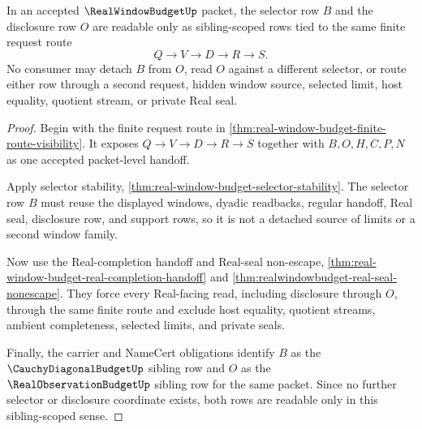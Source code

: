 \begin{theorem}
\label{thm:realwindowbudget-selector-disclosure-scope}
In an accepted $\RealWindowBudgetUp$ packet, the selector row $B$ and the
disclosure row $O$ are readable only as sibling-scoped rows tied to the same
finite request route
$$
Q \to V \to D \to R \to S.
$$
No consumer may detach $B$ from $O$, read $O$ against a different selector, or
route either row through a second request, hidden window source, selected
limit, host equality, quotient stream, or private Real seal.
\end{theorem}
\begin{proof}
Begin with the finite request route in
\autoref{thm:real-window-budget-finite-route-visibility}. It exposes
$Q \to V \to D \to R \to S$ together with $B,O,H,C,P,N$ as one accepted
packet-level handoff.

Apply selector stability, \autoref{thm:real-window-budget-selector-stability}.
The selector row $B$ must reuse the displayed windows, dyadic readbacks,
regular handoff, Real seal, disclosure row, and support rows, so it is not a
detached source of limits or a second window family.

Now use the Real-completion handoff and Real-seal non-escape,
\autoref{thm:real-window-budget-real-completion-handoff} and
\autoref{thm:realwindowbudget-real-seal-nonescape}. They force every
Real-facing read, including disclosure through $O$, through the same finite
route and exclude host equality, quotient streams, ambient completeness,
selected limits, and private seals.

Finally, the carrier and NameCert obligations identify $B$ as the
$\CauchyDiagonalBudgetUp$ sibling row and $O$ as the
$\RealObservationBudgetUp$ sibling row for the same packet. Since no further
selector or disclosure coordinate exists, both rows are readable only in this
sibling-scoped sense.
\end{proof}

